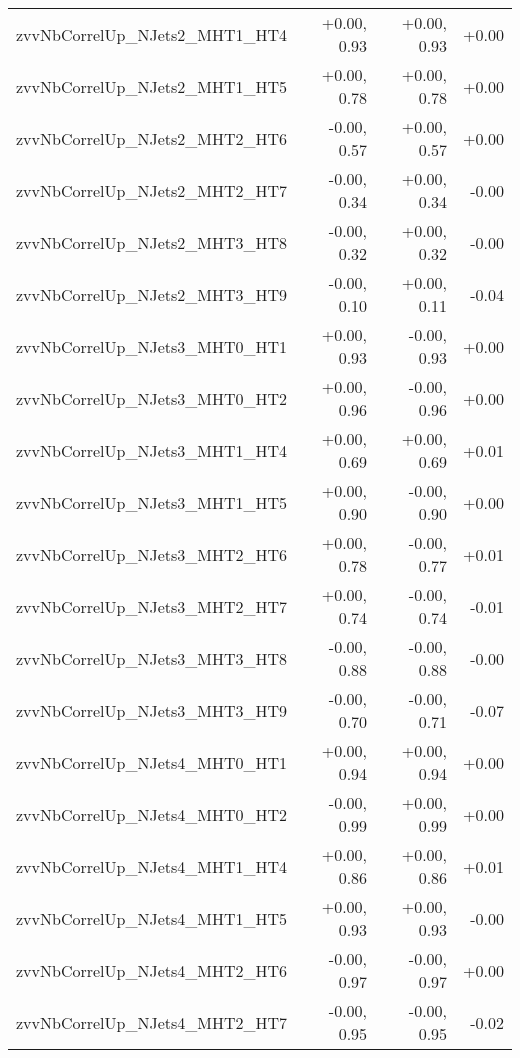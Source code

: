 \begin{tabular}{|l|r|r|r|}
zvvNbCorrelUp\_NJets2\_MHT1\_HT4         &      +0.00, 0.93 &     +0.00, 0.93 &  +0.00 \\
zvvNbCorrelUp\_NJets2\_MHT1\_HT5         &      +0.00, 0.78 &     +0.00, 0.78 &  +0.00 \\
zvvNbCorrelUp\_NJets2\_MHT2\_HT6         &      -0.00, 0.57 &     +0.00, 0.57 &  +0.00 \\
zvvNbCorrelUp\_NJets2\_MHT2\_HT7         &      -0.00, 0.34 &     +0.00, 0.34 &  -0.00 \\
zvvNbCorrelUp\_NJets2\_MHT3\_HT8         &      -0.00, 0.32 &     +0.00, 0.32 &  -0.00 \\
zvvNbCorrelUp\_NJets2\_MHT3\_HT9         &      -0.00, 0.10 &     +0.00, 0.11 &  -0.04 \\
zvvNbCorrelUp\_NJets3\_MHT0\_HT1         &      +0.00, 0.93 &     -0.00, 0.93 &  +0.00 \\
zvvNbCorrelUp\_NJets3\_MHT0\_HT2         &      +0.00, 0.96 &     -0.00, 0.96 &  +0.00 \\
zvvNbCorrelUp\_NJets3\_MHT1\_HT4         &      +0.00, 0.69 &     +0.00, 0.69 &  +0.01 \\
zvvNbCorrelUp\_NJets3\_MHT1\_HT5         &      +0.00, 0.90 &     -0.00, 0.90 &  +0.00 \\
zvvNbCorrelUp\_NJets3\_MHT2\_HT6         &      +0.00, 0.78 &     -0.00, 0.77 &  +0.01 \\
zvvNbCorrelUp\_NJets3\_MHT2\_HT7         &      +0.00, 0.74 &     -0.00, 0.74 &  -0.01 \\
zvvNbCorrelUp\_NJets3\_MHT3\_HT8         &      -0.00, 0.88 &     -0.00, 0.88 &  -0.00 \\
zvvNbCorrelUp\_NJets3\_MHT3\_HT9         &      -0.00, 0.70 &     -0.00, 0.71 &  -0.07 \\
zvvNbCorrelUp\_NJets4\_MHT0\_HT1         &      +0.00, 0.94 &     +0.00, 0.94 &  +0.00 \\
zvvNbCorrelUp\_NJets4\_MHT0\_HT2         &      -0.00, 0.99 &     +0.00, 0.99 &  +0.00 \\
zvvNbCorrelUp\_NJets4\_MHT1\_HT4         &      +0.00, 0.86 &     +0.00, 0.86 &  +0.01 \\
zvvNbCorrelUp\_NJets4\_MHT1\_HT5         &      +0.00, 0.93 &     +0.00, 0.93 &  -0.00 \\
zvvNbCorrelUp\_NJets4\_MHT2\_HT6         &      -0.00, 0.97 &     -0.00, 0.97 &  +0.00 \\
zvvNbCorrelUp\_NJets4\_MHT2\_HT7         &      -0.00, 0.95 &     -0.00, 0.95 &  -0.02 \\

\end{tabular}
